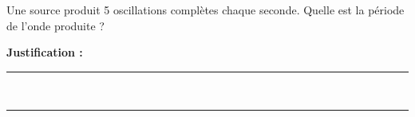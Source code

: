 Une source produit \num{5} oscillations complètes chaque seconde. Quelle est la période de l'onde produite ?

\choices

\noindent\textbf{Justification :} \hrulefill \\[2.5ex]
\rule{\linewidth}{0.4pt} \\[2.5ex]
\rule{\linewidth}{0.4pt}
\vfill
